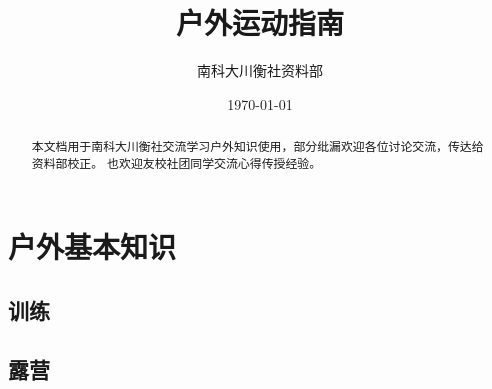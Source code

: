 \documentclass[UTF8]{ctexbook}
\title{户外运动指南}
\author{南科大川衡社资料部}
\date{\today}
\begin{document}
\maketitle

\begin{abstract}
   本文档用于南科大川衡社交流学习户外知识使用，部分纰漏欢迎各位讨论交流，传达给资料部校正。
    也欢迎友校社团同学交流心得传授经验。
\end{abstract}

\tableofcontents

\chapter{户外基本知识}
\section{训练}

\section{露营}
\end{document}
